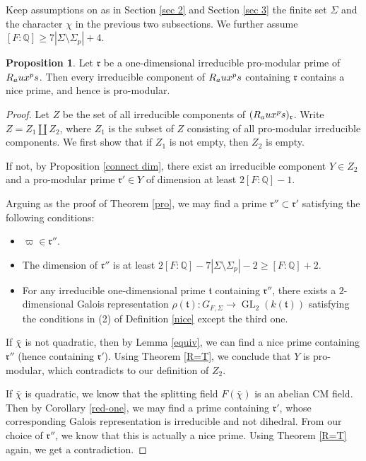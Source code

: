 \documentclass[12pt]{amsart}
\theoremstyle{plain}
\theoremstyle{definition}
\newtheorem{prop}[thm]{Proposition}
\theoremstyle{remark}
\begin{document}
Keep assumptions on as in Section \ref{sec 2} and Section \ref{sec 3} the finite set $\Sigma$ and the character $\chi$ in the previous two subsections. We further assume $[F:\mathbb{Q}] \ge 7|\Sigma \setminus \Sigma_p|+4.$

\begin{prop}\label{promodular to nice}
	Let $\mathfrak{r}$ be a one-dimensional irreducible pro-modular prime of $R_\textnormal{aux}^\textnormal{ps} $. Then every irreducible component of $R_\textnormal{aux}^\textnormal{ps} $ containing $\mathfrak{r}$ contains a nice prime, and hence is pro-modular.
\end{prop}

\begin{proof}
	Let $Z$ be the set of all irreducible components of $(R_\textnormal{aux}^\textnormal{ps})_{\mathfrak{r}} $. Write $Z= Z_1 \amalg Z_2$, where $Z_1$ is the subset of $Z$ consisting of all pro-modular irreducible components. We first show that if $Z_1$ is not empty, then $Z_2$ is empty.
	
	If not, by Proposition \ref{connect dim}, there exist an irreducible component $Y \in Z_2$ and a pro-modular prime $\mathfrak{r}' \in Y$ of dimension at least $2[F: \mathbb{Q}]-1$.
	
	Arguing as the proof of Theorem \ref{pro}, we may find a prime $\mathfrak{r}'' \subset \mathfrak{r}'$ satisfying the following conditions:
	\begin{itemize}
		\item $\varpi \in \mathfrak{r}''$.
		\item  The dimension of $\mathfrak{r}'' $ is at least $ 2[F: \mathbb{Q}]-7|\Sigma\setminus\Sigma_p|-2 \ge [F: \mathbb{Q}]+2$.
		\item  For any irreducible one-dimensional prime $\mathfrak{t}$ containing $\mathfrak{r}''$, there exists a $2$-dimensional Galois representation $\rho(\mathfrak{t}) : G_{F, \Sigma} \to \operatorname{GL}_2(k(\mathfrak{t}))$ satisfying the conditions in (2) of Definition \ref{nice} except the third one.
	\end{itemize}
	
	If $\bar{\chi}$ is not quadratic, then by Lemma \ref{equiv}, we can find a nice prime containing $\mathfrak{r}''$ (hence containing $\mathfrak{r}'$). Using Theorem \ref{R=T}, we conclude that $Y$ is pro-modular, which contradicts to our definition of $Z_2$.
	
	If $\bar{\chi}$ is quadratic, we know that the splitting field $F(\bar{\chi})$ is an abelian CM field. Then by Corollary \ref{red-one}, we may find a prime containing $\mathfrak{r}'$, whose corresponding Galois representation is irreducible and not dihedral. From our choice of $\mathfrak{r}''$, we know that this is actually a nice prime. Using Theorem \ref{R=T} again, we get a contradiction.
	

\end{proof}
\end{document}
